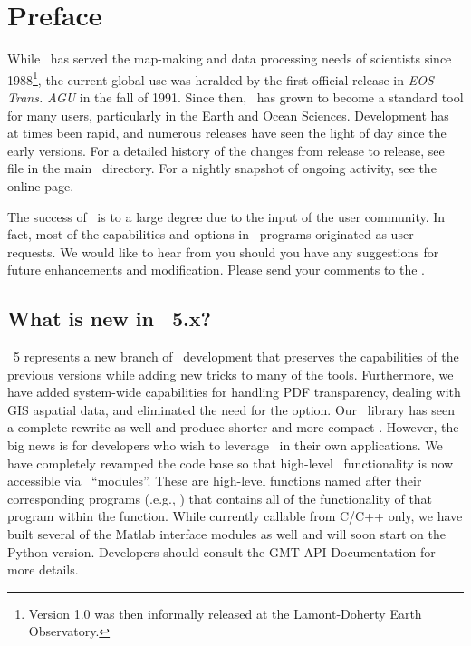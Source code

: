%
%
\chapter{Preface} 
\label{ch:1}
\thispagestyle{headings}

While \GMT\ has served the map-making and data processing needs of scientists since 1988\footnote{Version
1.0 was then informally released at the Lamont-Doherty Earth Observatory.}, the current global use was
heralded by the first official release in \emph{EOS Trans. AGU} in the fall of 1991.  Since then,
\GMT\ has grown to become a standard tool for many users, particularly in the Earth and Ocean Sciences.
Development has at times been rapid, and numerous releases have seen the light of day since the early
versions.  For a detailed history of the changes from release to release, see file 
in the main \GMT\ directory.  For a nightly snapshot of ongoing activity, see the online
 page.

The success of \GMT\ is to a large degree due to the input of the user community. In fact, most of the
capabilities and options in \GMT\ programs originated as user requests.
We would like to hear from you should you have any suggestions for future enhancements and modification.
Please send your comments to the
.

\section{What is new in \gmt\ 5.x?}

\GMT\ 5 represents a new branch of \GMT\ development that preserves the capabilities of the previous
versions while adding new tricks to many of the tools.  Furthermore, we have added system-wide
capabilities for handling PDF transparency, dealing with GIS aspatial data, and eliminated the need
for the  option.  Our \PS\ library  has seen a complete rewrite as well and produce
shorter and more compact \PS.
However, the big news is for developers who wish to leverage \GMT\ in their
own applications.  We have completely revamped the code base so that high-level \GMT\ functionality
is now accessible via \GMT\ ``modules''.  These are high-level functions named after their corresponding
programs (.e.g., ) that contains all of the functionality of that program within
the function.  While currently callable from C/C++ only, we have built several of the Matlab interface
modules as well and will soon start on the Python version.  Developers should consult the GMT API Documentation for more details.

